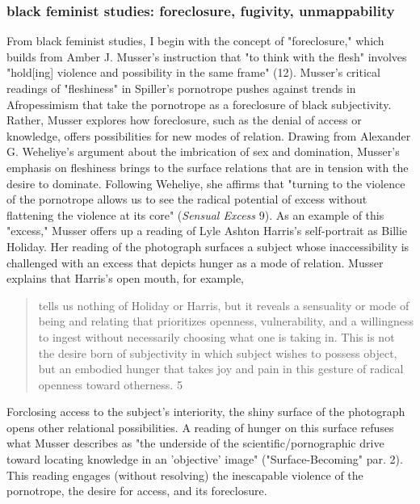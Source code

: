 \documentclass[11pt]{article}
\begin{document}
\subsubsection{black feminist studies: foreclosure, fugivity, unmappability}
\label{sec:orge4faa02}
From black feminist studies, I begin with the concept of
"foreclosure," which builds from Amber J. Musser's instruction that
"to think with the flesh" involves "hold[ing] violence and possibility
in the same frame" (12). Musser's critical readings of "fleshiness" in
Spiller's pornotrope pushes against trends in Afropessimism that take
the pornotrope as a foreclosure of black subjectivity. Rather, Musser
explores how foreclosure, such as the denial of access or knowledge,
offers possibilities for new modes of relation. Drawing from Alexander
G. Weheliye's argument about the imbrication of sex and domination,
Musser's emphasis on fleshiness brings to the surface relations that
are in tension with the desire to dominate. Following Weheliye, she
affirms that "turning to the violence of the pornotrope allows us to
see the radical potential of excess without flattening the violence at
its core" (\emph{Sensual Excess} 9). As an example of this "excess," Musser
offers up a reading of Lyle Ashton Harris's self-portrait as Billie
Holiday. Her reading of the photograph surfaces a subject whose
inaccessibility is challenged with an excess that depicts hunger as a
mode of relation. Musser explains that Harris's open mouth, for
example,
\begin{quote}
tells us nothing of Holiday or Harris, but it reveals a sensuality or
mode of being and relating that prioritizes openness, vulnerability,
and a willingness to ingest without necessarily choosing what one is
taking in. This is not the desire born of subjectivity in which
subject wishes to possess object, but an embodied hunger that takes
joy and pain in this gesture of radical openness toward otherness. 5
\end{quote}
Forclosing access to the subject's interiority, the shiny surface of
the photograph opens other relational possibilities. A reading of
hunger on this surface refuses what Musser describes as "the underside
of the scientific/pornographic drive toward locating knowledge in an
'objective' image" ("Surface-Becoming" par. 2). This reading engages
(without resolving) the inescapable violence of the pornotrope, the
desire for access, and its foreclosure.
\end{document}
